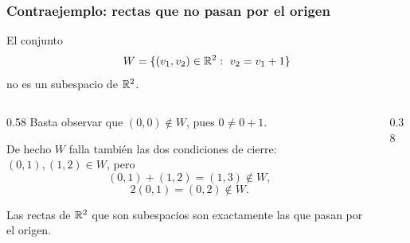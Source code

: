 \begin{frame}
    \frametitle{Contraejemplo: rectas que no pasan por el origen}

    \begin{example}
        El conjunto
        \[
            W=\{(v_1,v_2)\in\R^2:\ v_2=v_1+1\}
        \]
        \alert{no} es un subespacio de $\mathbb{R}^2$.
    \end{example}

    \begin{columns}[T]
        \begin{column}{0.58\textwidth}
            Basta observar que $(0,0)\notin W$, pues $0\neq0+1$.

            \medskip

            De hecho $W$ falla también las dos condiciones de cierre:
            $(0,1),(1,2)\in W$, pero
            \[
                (0,1)+(1,2)=(1,3)\notin W,
            \]
            \[
                2(0,1)=(0,2)\notin W.
            \]

            Las rectas de $\mathbb{R}^2$ que son subespacios son exactamente las que
            \alert{pasan por el origen}.
        \end{column}
        \begin{column}{0.38\textwidth}
            \centering
        \end{column}
    \end{columns}
\end{frame}

